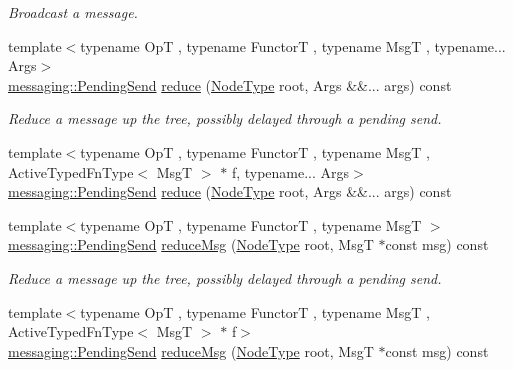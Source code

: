 \begin{DoxyCompactItemize}
\begin{DoxyCompactList}\small\item\em Broadcast a message. \end{DoxyCompactList}\item 
{\footnotesize template$<$typename OpT , typename FunctorT , typename MsgT , typename... Args$>$ }\\\hyperlink{structvt_1_1messaging_1_1_pending_send}{messaging\+::\+Pending\+Send} \hyperlink{structvt_1_1objgroup_1_1proxy_1_1_proxy_3_01void_01_4_a8e3989588197eb5dc128302c93e74468}{reduce} (\hyperlink{namespacevt_a866da9d0efc19c0a1ce79e9e492f47e2}{Node\+Type} root, Args \&\&... args) const
\begin{DoxyCompactList}\small\item\em Reduce a message up the tree, possibly delayed through a pending send. \end{DoxyCompactList}\item 
{\footnotesize template$<$typename OpT , typename FunctorT , typename MsgT , Active\+Typed\+Fn\+Type$<$ Msg\+T $>$ $\ast$ f, typename... Args$>$ }\\\hyperlink{structvt_1_1messaging_1_1_pending_send}{messaging\+::\+Pending\+Send} \hyperlink{structvt_1_1objgroup_1_1proxy_1_1_proxy_3_01void_01_4_a95d80c0e5dc7fad3d49f834692c8da38}{reduce} (\hyperlink{namespacevt_a866da9d0efc19c0a1ce79e9e492f47e2}{Node\+Type} root, Args \&\&... args) const
\item 
{\footnotesize template$<$typename OpT , typename FunctorT , typename MsgT $>$ }\\\hyperlink{structvt_1_1messaging_1_1_pending_send}{messaging\+::\+Pending\+Send} \hyperlink{structvt_1_1objgroup_1_1proxy_1_1_proxy_3_01void_01_4_a545aeca8f6c0250221796b2138a4583d}{reduce\+Msg} (\hyperlink{namespacevt_a866da9d0efc19c0a1ce79e9e492f47e2}{Node\+Type} root, MsgT $\ast$const msg) const
\begin{DoxyCompactList}\small\item\em Reduce a message up the tree, possibly delayed through a pending send. \end{DoxyCompactList}\item 
{\footnotesize template$<$typename OpT , typename FunctorT , typename MsgT , Active\+Typed\+Fn\+Type$<$ Msg\+T $>$ $\ast$ f$>$ }\\\hyperlink{structvt_1_1messaging_1_1_pending_send}{messaging\+::\+Pending\+Send} \hyperlink{structvt_1_1objgroup_1_1proxy_1_1_proxy_3_01void_01_4_a43d410b08ba8470cf0f060435b4f9ba3}{reduce\+Msg} (\hyperlink{namespacevt_a866da9d0efc19c0a1ce79e9e492f47e2}{Node\+Type} root, MsgT $\ast$const msg) const
\end{DoxyCompactItemize}


